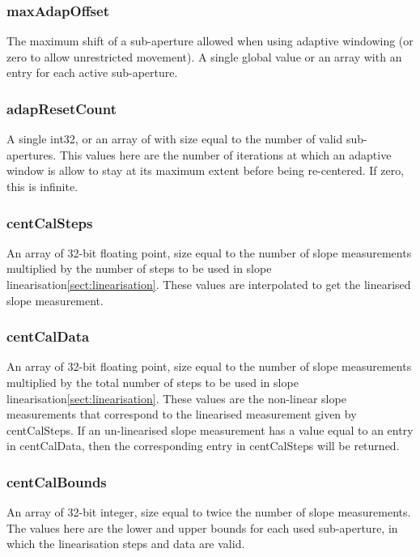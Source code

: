 \documentclass[a4,10pt]{article}
\begin{document}
\subsubsection{maxAdapOffset}
The maximum shift of a sub-aperture allowed when using adaptive
windowing (or zero to allow unrestricted movement).  A single global
value or an array with an entry for each active sub-aperture.

\subsubsection{adapResetCount}
A single int32, or an array of with size equal to the number of valid
sub-apertures.  This values here are the number of iterations at which
an adaptive window is allow to stay at its maximum extent before being
re-centered.  If zero, this is infinite.

\subsubsection{centCalSteps}
An array of 32-bit floating point, size equal to the number of slope
measurements multiplied by the number of steps to be used in slope
linearisation\ref{sect:linearisation}.  These values are interpolated
to get the linearised slope measurement.

\subsubsection{centCalData}
An array of 32-bit floating point, size equal to the number of slope
measurements multiplied by the total number of steps to be used in
slope linearisation\ref{sect:linearisation}.  These values are the
non-linear slope measurements that correspond to the linearised
measurement given by centCalSteps.  If an un-linearised slope
measurement has a value equal to an entry in centCalData, then the
corresponding entry in centCalSteps will be returned.

\subsubsection{centCalBounds}
An array of 32-bit integer, size equal to twice the number of slope
measurements.  The values here are the lower and upper bounds for each
used sub-aperture, in which the linearisation steps and data are valid.
\end{document}
